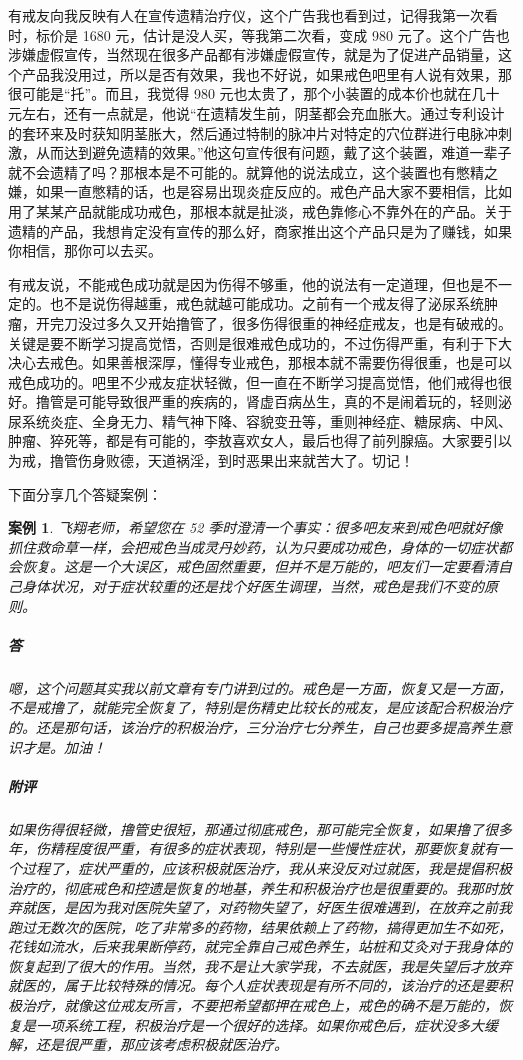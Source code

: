 \documentclass{ctexart}
\newtheorem{case}{案例}
\begin{document}
有戒友向我反映有人在宣传遗精治疗仪，这个广告我也看到过，记得我第一次看时，标价是 1680 元，估计是没人买，等我第二次看，变成 980 元了。这个广告也涉嫌虚假宣传，当然现在很多产品都有涉嫌虚假宣传，就是为了促进产品销量，这个产品我没用过，所以是否有效果，我也不好说，如果戒色吧里有人说有效果，那很可能是“托”。而且，我觉得 980 元也太贵了，那个小装置的成本价也就在几十元左右，还有一点就是，他说“在遗精发生前，阴茎都会充血胀大。通过专利设计的套环来及时获知阴茎胀大，然后通过特制的脉冲片对特定的穴位群进行电脉冲刺激，从而达到避免遗精的效果。”他这句宣传很有问题，戴了这个装置，难道一辈子就不会遗精了吗？那根本是不可能的。就算他的说法成立，这个装置也有憋精之嫌，如果一直憋精的话，也是容易出现炎症反应的。戒色产品大家不要相信，比如用了某某产品就能成功戒色，那根本就是扯淡，戒色靠修心不靠外在的产品。关于遗精的产品，我想肯定没有宣传的那么好，商家推出这个产品只是为了赚钱，如果你相信，那你可以去买。

有戒友说，不能戒色成功就是因为伤得不够重，他的说法有一定道理，但也是不一定的。也不是说伤得越重，戒色就越可能成功。之前有一个戒友得了泌尿系统肿瘤，开完刀没过多久又开始撸管了，很多伤得很重的神经症戒友，也是有破戒的。关键是要不断学习提高觉悟，否则是很难戒色成功的，不过伤得严重，有利于下大决心去戒色。如果善根深厚，懂得专业戒色，那根本就不需要伤得很重，也是可以戒色成功的。吧里不少戒友症状轻微，但一直在不断学习提高觉悟，他们戒得也很好。撸管是可能导致很严重的疾病的，肾虚百病丛生，真的不是闹着玩的，轻则泌尿系统炎症、全身无力、精气神下降、容貌变丑等，重则神经症、糖尿病、中风、肿瘤、猝死等，都是有可能的，李敖喜欢女人，最后也得了前列腺癌。大家要引以为戒，撸管伤身败德，天道祸淫，到时恶果出来就苦大了。切记！

下面分享几个答疑案例：

\begin{case}
    飞翔老师，希望您在 52 季时澄清一个事实：很多吧友来到戒色吧就好像抓住救命草一样，会把戒色当成灵丹妙药，认为只要成功戒色，身体的一切症状都会恢复。这是一个大误区，戒色固然重要，但并不是万能的，吧友们一定要看清自己身体状况，对于症状较重的还是找个好医生调理，当然，戒色是我们不变的原则。
    \subparagraph{答} 嗯，这个问题其实我以前文章有专门讲到过的。戒色是一方面，恢复又是一方面，不是戒撸了，就能完全恢复了，特别是伤精史比较长的戒友，是应该配合积极治疗的。还是那句话，该治疗的积极治疗，三分治疗七分养生，自己也要多提高养生意识才是。加油！
    \subparagraph{附评} 如果伤得很轻微，撸管史很短，那通过彻底戒色，那可能完全恢复，如果撸了很多年，伤精程度很严重，有很多的症状表现，特别是一些慢性症状，那要恢复就有一个过程了，症状严重的，应该积极就医治疗，我从来没反对过就医，我是提倡积极治疗的，彻底戒色和控遗是恢复的地基，养生和积极治疗也是很重要的。我那时放弃就医，是因为我对医院失望了，对药物失望了，好医生很难遇到，在放弃之前我跑过无数次的医院，吃了非常多的药物，结果依赖上了药物，搞得更加生不如死，花钱如流水，后来我果断停药，就完全靠自己戒色养生，站桩和艾灸对于我身体的恢复起到了很大的作用。当然，我不是让大家学我，不去就医，我是失望后才放弃就医的，属于比较特殊的情况。每个人症状表现是有所不同的，该治疗的还是要积极治疗，就像这位戒友所言，不要把希望都押在戒色上，戒色的确不是万能的，恢复是一项系统工程，积极治疗是一个很好的选择。如果你戒色后，症状没多大缓解，还是很严重，那应该考虑积极就医治疗。
\end{case}
\end{document}
